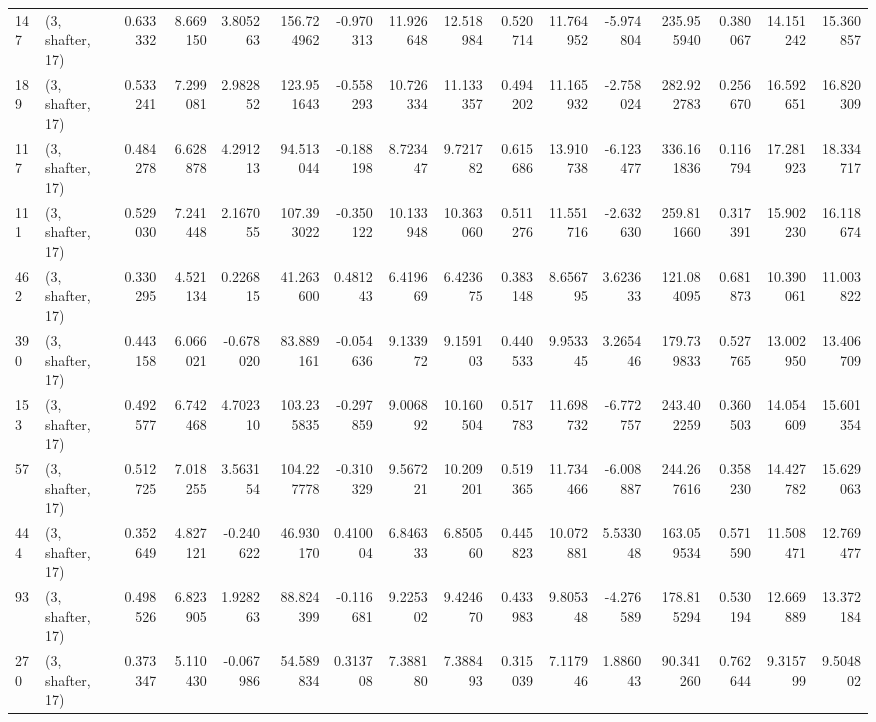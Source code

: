 \begin{tabular}{llrrrrrrrrrrrrrr}
147 &  (3, shafter, 17) &   0.633332 &   8.669150 &   3.805263 &   156.724962 &  -0.970313 &  11.926648 &  12.518984 &  0.520714 &  11.764952 &  -5.974804 &   235.955940 &  0.380067 &  14.151242 &  15.360857 \\
189 &  (3, shafter, 17) &   0.533241 &   7.299081 &   2.982852 &   123.951643 &  -0.558293 &  10.726334 &  11.133357 &  0.494202 &  11.165932 &  -2.758024 &   282.922783 &  0.256670 &  16.592651 &  16.820309 \\
117 &  (3, shafter, 17) &   0.484278 &   6.628878 &   4.291213 &    94.513044 &  -0.188198 &   8.723447 &   9.721782 &  0.615686 &  13.910738 &  -6.123477 &   336.161836 &  0.116794 &  17.281923 &  18.334717 \\
111 &  (3, shafter, 17) &   0.529030 &   7.241448 &   2.167055 &   107.393022 &  -0.350122 &  10.133948 &  10.363060 &  0.511276 &  11.551716 &  -2.632630 &   259.811660 &  0.317391 &  15.902230 &  16.118674 \\
462 &  (3, shafter, 17) &   0.330295 &   4.521134 &   0.226815 &    41.263600 &   0.481243 &   6.419669 &   6.423675 &  0.383148 &   8.656795 &   3.623633 &   121.084095 &  0.681873 &  10.390061 &  11.003822 \\
390 &  (3, shafter, 17) &   0.443158 &   6.066021 &  -0.678020 &    83.889161 &  -0.054636 &   9.133972 &   9.159103 &  0.440533 &   9.953345 &   3.265446 &   179.739833 &  0.527765 &  13.002950 &  13.406709 \\
153 &  (3, shafter, 17) &   0.492577 &   6.742468 &   4.702310 &   103.235835 &  -0.297859 &   9.006892 &  10.160504 &  0.517783 &  11.698732 &  -6.772757 &   243.402259 &  0.360503 &  14.054609 &  15.601354 \\
57  &  (3, shafter, 17) &   0.512725 &   7.018255 &   3.563154 &   104.227778 &  -0.310329 &   9.567221 &  10.209201 &  0.519365 &  11.734466 &  -6.008887 &   244.267616 &  0.358230 &  14.427782 &  15.629063 \\
444 &  (3, shafter, 17) &   0.352649 &   4.827121 &  -0.240622 &    46.930170 &   0.410004 &   6.846333 &   6.850560 &  0.445823 &  10.072881 &   5.533048 &   163.059534 &  0.571590 &  11.508471 &  12.769477 \\
93  &  (3, shafter, 17) &   0.498526 &   6.823905 &   1.928263 &    88.824399 &  -0.116681 &   9.225302 &   9.424670 &  0.433983 &   9.805348 &  -4.276589 &   178.815294 &  0.530194 &  12.669889 &  13.372184 \\
270 &  (3, shafter, 17) &   0.373347 &   5.110430 &  -0.067986 &    54.589834 &   0.313708 &   7.388180 &   7.388493 &  0.315039 &   7.117946 &   1.886043 &    90.341260 &  0.762644 &   9.315799 &   9.504802 \\

\end{tabular}
